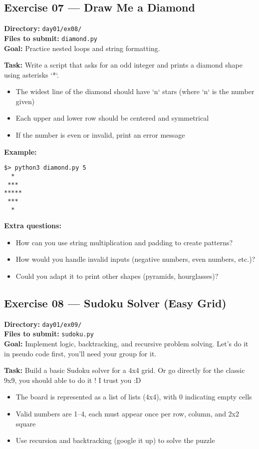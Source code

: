 \documentclass[12pt,a4paper]{article}
\begin{document}
\newpage
\subsection*{Exercise 07 — Draw Me a Diamond}
\textbf{Directory:} \texttt{day01/ex08/}\\
\textbf{Files to submit:} \texttt{diamond.py}\\
\textbf{Goal:} Practice nested loops and string formatting.

\textbf{Task:} Write a script that asks for an odd integer and prints a diamond shape using asterisks `*`.
\begin{itemize}
  \item The widest line of the diamond should have `n` stars (where `n` is the number given)
  \item Each upper and lower row should be centered and symmetrical
  \item If the number is even or invalid, print an error message
\end{itemize}

\textbf{Example:}
\begin{lstlisting}
$> python3 diamond.py 5
  *
 ***
*****
 ***
  *
\end{lstlisting}

\textbf{Extra questions:}
\begin{itemize}
  \item How can you use string multiplication and padding to create patterns?
  \item How would you handle invalid inputs (negative numbers, even numbers, etc.)?
  \item Could you adapt it to print other shapes (pyramids, hourglasses)?
\end{itemize}

\newpage
\subsection*{Exercise 08 — Sudoku Solver (Easy Grid)}
\textbf{Directory:} \texttt{day01/ex09/}\\
\textbf{Files to submit:} \texttt{sudoku.py}\\
\textbf{Goal:} Implement logic, backtracking, and recursive problem solving. Let's do it in pseudo code first, you'll need your group for it.

\textbf{Task:} Build a basic Sudoku solver for a 4x4 grid. Or go directly for the classic 9x9, you should able to do it ! I trust you :D
\begin{itemize}
  \item The board is represented as a list of lists (4x4), with 0 indicating empty cells
  \item Valid numbers are 1–4, each must appear once per row, column, and 2x2 square
  \item Use recursion and backtracking (google it up) to solve the puzzle
\end{itemize}
\end{document}
